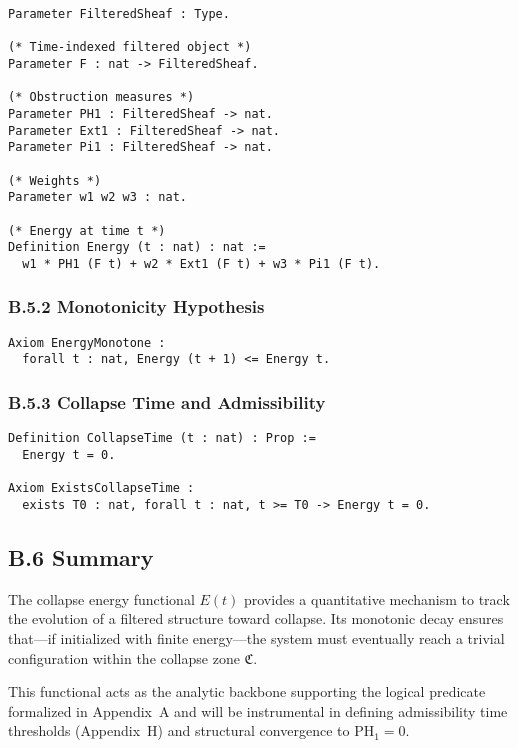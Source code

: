 \documentclass[11pt]{article}
\begin{document}
\begin{lstlisting}[language=Coq, caption=Collapse Energy Function Definition, captionpos=b]
Parameter FilteredSheaf : Type.

(* Time-indexed filtered object *)
Parameter F : nat -> FilteredSheaf.

(* Obstruction measures *)
Parameter PH1 : FilteredSheaf -> nat.
Parameter Ext1 : FilteredSheaf -> nat.
Parameter Pi1 : FilteredSheaf -> nat.

(* Weights *)
Parameter w1 w2 w3 : nat.

(* Energy at time t *)
Definition Energy (t : nat) : nat :=
  w1 * PH1 (F t) + w2 * Ext1 (F t) + w3 * Pi1 (F t).
\end{lstlisting}

\subsubsection*{B.5.2 Monotonicity Hypothesis}

\begin{lstlisting}[language=Coq, caption=Monotonicity of Energy, captionpos=b]
Axiom EnergyMonotone :
  forall t : nat, Energy (t + 1) <= Energy t.
\end{lstlisting}

\subsubsection*{B.5.3 Collapse Time and Admissibility}

\begin{lstlisting}[language=Coq, caption=Collapse Time Existence, captionpos=b]
Definition CollapseTime (t : nat) : Prop :=
  Energy t = 0.

Axiom ExistsCollapseTime :
  exists T0 : nat, forall t : nat, t >= T0 -> Energy t = 0.
\end{lstlisting}

\subsection*{B.6 Summary}

The collapse energy functional \( E(t) \) provides a quantitative mechanism to track the evolution of a filtered structure toward collapse. Its monotonic decay ensures that—if initialized with finite energy—the system must eventually reach a trivial configuration within the collapse zone \( \mathfrak{C} \).

This functional acts as the analytic backbone supporting the logical predicate formalized in Appendix~A and will be instrumental in defining admissibility time thresholds (Appendix~H) and structural convergence to \( \mathrm{PH}_1 = 0 \).
\end{document}
